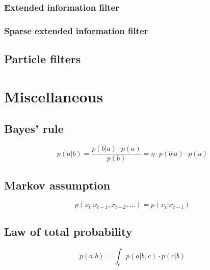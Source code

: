 \documentclass{article}
\begin{document}
\subsubsection{Extended information filter}

\subsubsection{Sparse extended information filter}

\subsection{Particle filters}

\section{Miscellaneous}

\subsection{Bayes' rule}
\begin{equation}\label{bayes}
  p(a \vert b) = \frac{p(b \vert a) \cdot p(a)}{p(b)}
    = \eta \cdot p(b \vert a) \cdot p(a)
\end{equation}

\subsection{Markov assumption}
\begin{equation}\label{markov}
  p(x_t \vert x_{t-1}, x_{t-2}, \dots) = p(x_t \vert x_{t-1})
\end{equation}

\subsection{Law of total probability}
\begin{equation}\label{totalprobability}
  p(a \vert b) = \int_{c} p(a \vert b, c) \cdot p(c \vert b)
\end{equation}

\printbibliography{}
\end{document}
